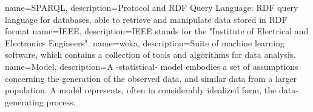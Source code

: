 {
	name=SPARQL,
	description={Protocol and RDF Query Language: RDF query language for databases, able to retrieve and manipulate data stored in RDF format }
}
{
	name=IEEE,
	description={IEEE stands for the "Institute of Electrical and Electronics Engineers".}
}
{
	name=weka,
	description={Suite of machine learning software, which contains a collection of tools and algorithms for data analysis.}
}
{
	name=Model,
	description={A -statistical- model embodies a set of assumptions concerning the generation of the observed data, and similar data from a larger population. A model represents, often in considerably idealized form, the data-generating process.}
}